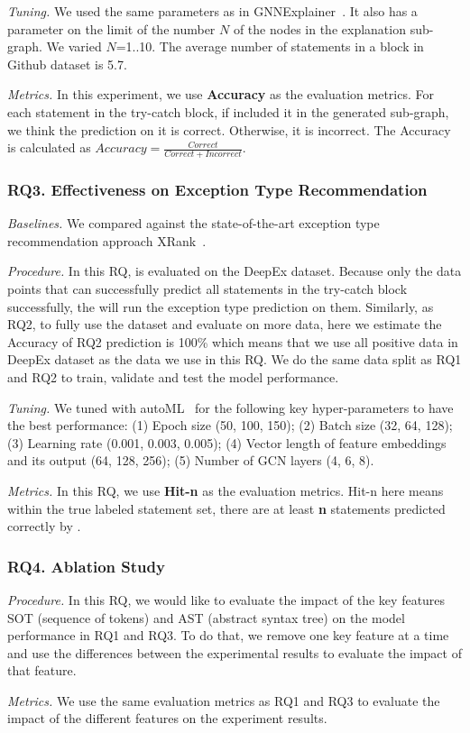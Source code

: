 {\em Tuning.} We used the same parameters as in
GNNExplainer~\cite{GNNExplainer}. It also has a parameter on the limit
of the number $N$ of the nodes in the explanation sub-graph. We
varied $N$=1..10. The average number of statements in a
 block in Github dataset is 5.7.


{\em Metrics.} In this experiment, we use \textbf{Accuracy} as the
evaluation metrics. For each statement in the try-catch block, if
\tool included it in the generated sub-graph, we think the prediction
on it is correct. Otherwise, it is incorrect. The Accuracy is
calculated as $Accuracy = \frac{Correct}{Correct + Incorrect}$.

\subsubsection{RQ3. Effectiveness on Exception Type Recommendation}

{\em Baselines.} We compared {\tool} against the state-of-the-art exception type recommendation approach XRank~\cite{nguyen2020code}.

{\em Procedure.} In this RQ, \tool is evaluated on the DeepEx dataset. Because only the data points that \tool can successfully predict all statements in the try-catch block successfully, the \tool will run the exception type prediction on them. Similarly, as RQ2, to fully use the dataset and evaluate \tool on more data, here we estimate the Accuracy of RQ2 prediction is 100\% which means that we use all positive data in DeepEx dataset as the data we use in this RQ. We do the same data split as RQ1 and RQ2 to train, validate and test the model performance.

{\em Tuning.} We tuned {\tool} with autoML~\cite{NNI} for the following key hyper-parameters to have the best performance: (1) Epoch size (50, 100, 150); (2) Batch size (32, 64, 128); (3) Learning rate (0.001, 0.003, 0.005); (4) Vector length of feature embeddings and its output (64, 128, 256); (5) Number of GCN layers (4, 6, 8).

{\em Metrics.} In this RQ, we use \textbf{Hit-n} as the evaluation metrics. Hit-n here means within the true labeled statement set, there are at least \textbf{n} statements predicted correctly by \tool.

\subsubsection{RQ4. Ablation Study}

{\em Procedure.} In this RQ, we would like to evaluate the impact of the key features SOT (sequence of tokens) and AST (abstract syntax tree) on the model performance in RQ1 and RQ3. To do that, we remove one key feature at a time and use the differences between the experimental results to evaluate the impact of that feature.

{\em Metrics.} We use the same evaluation metrics as RQ1 and RQ3 to evaluate the impact of the different features on the experiment results.
